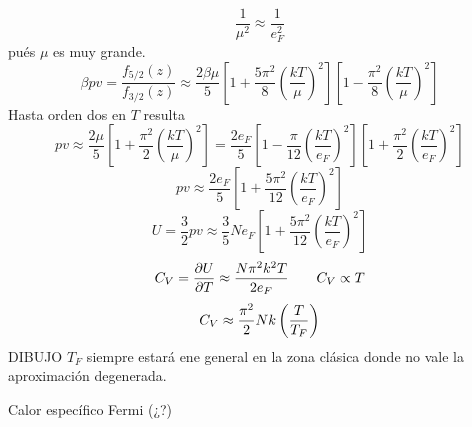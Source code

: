 \documentclass[10pt,oneside]{CBFT_book}
\begin{document}
\begin{itemize}
 \[
	\frac{1}{\mu^2} \approx \frac{1}{e_F^2}
 \]
 pués $ \mu $ es muy grande.
 \[
	\beta p v = \frac{ f_{5/2}(z) }{ f_{3/2}(z) } \approx \frac{ 2 \beta \mu }{ 5 } 
	\left[ 1 + \frac{ 5\pi^2 }{ 8 } \left( \frac{kT}{\mu} \right)^2 \right]
	\left[ 1 - \frac{ \pi^2 }{ 8 } \left( \frac{kT}{\mu} \right)^2 \right]
 \]
 Hasta orden dos en $ T $ resulta 
 \[
	pv \approx \frac{ 2 \mu }{ 5 } \left[ 1 + \frac{ \pi^2 }{ 2 } \left( \frac{kT}{\mu} \right)^2 \right] =
	\frac{ 2 e_F }{ 5 }\left[ 1 - \frac{ \pi }{ 12 } \left( \frac{kT}{e_F} \right)^2 \right] 
	\left[ 1 + \frac{ \pi^2 }{ 2 } \left( \frac{kT}{e_F} \right)^2 \right] 
 \]
 \[
	pv \approx \frac{ 2 e_F }{ 5 } \left[ 1 + \frac{ 5 \pi^2 }{ 12 } \left( \frac{kT}{e_F} \right)^2 \right] 
 \]
 \[
	U = \frac{3}{2} p v \approx \frac{3}{5} N e_F 
	\left[ 1 + \frac{ 5 \pi^2 }{ 12 } \left( \frac{kT}{e_F} \right)^2 \right] 
 \]
 \[
	C_V = \frac{\partial^{\hspace{-0.05em}} {U}}{\partial {T}^{\hspace{-0.05em}}} \approx \frac{ N \pi^2 k^2 T }{ 2e_F } \qquad C_V \propto T
 \]
 \[
	C_V \approx \frac{\pi^2}{2} Nk \left( \frac{ T }{ T_F } \right)
 \]
 DIBUJO 
 $T_F$ siempre estará ene general en la zona clásica donde no vale la aproximación degenerada.
 
 Calor específico Fermi (¿?)
\end{itemize}




\end{document}

